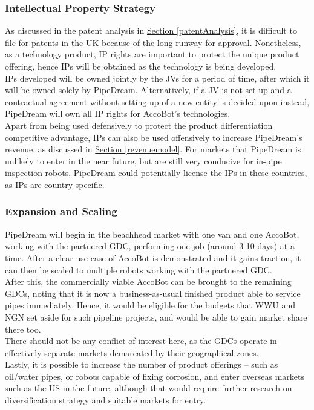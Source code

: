 \documentclass[11pt]{article}		%
\newcommand{\sectref}[1]{\hyperref[#1]{Section \ref*{#1}}}     %
\begin{document}
    	\subsubsection{Intellectual Property Strategy}\label{IPstrategy}
    	As discussed in the patent analysis in \sectref{patentAnalysis}, it is difficult to file for patents in the UK because of the long runway for approval. Nonetheless, as a technology product, IP rights are important to protect the unique product offering, hence IPs will be obtained as the technology is being developed.
        \\
        \hspace*{2ex}IPs developed will be owned jointly by the JVs for a period of time, after which it will be owned solely by PipeDream. Alternatively, if a JV is not set up and a contractual agreement without setting up of a new entity is decided upon instead, PipeDream will own all IP rights for AccoBot’s technologies. 
        \\
        \hspace*{2ex}Apart from being used defensively to protect the product differentiation competitive advantage, IPs can also be used offensively to increase PipeDream’s revenue, as discussed in \sectref{revenuemodel}. For markets that PipeDream is unlikely to enter in the near future, but are still very conducive for in-pipe inspection robots, PipeDream could potentially license the IPs in these countries, as IPs are country-specific. 
    
    	\subsubsection{Expansion and Scaling}
    	PipeDream will begin in the beachhead market with one van and one AccoBot, working with the partnered GDC, performing one job (around 3-10 days) at a time. After a clear use case of AccoBot is demonstrated and it gains traction, it can then be scaled to multiple robots working with the partnered GDC.
        \\
        \hspace*{2ex}After this, the commercially viable AccoBot can be brought to the remaining GDCs, noting that it is now a business-as-usual finished product able to service pipes immediately. Hence, it would be eligible for the budgets that WWU and NGN set aside for such pipeline projects, and would be able to gain market share there too. 
        \\
        \hspace*{2ex}There should not be any conflict of interest here, as the GDCs operate in effectively separate markets demarcated by their geographical zones. 
        \\
        \hspace*{2ex}Lastly, it is possible to increase the number of product offerings – such as oil/water pipes, or robots capable of fixing corrosion, and enter overseas markets such as the US in the future, although that would require further research on diversification strategy and suitable markets for entry. 
    
\end{document}
